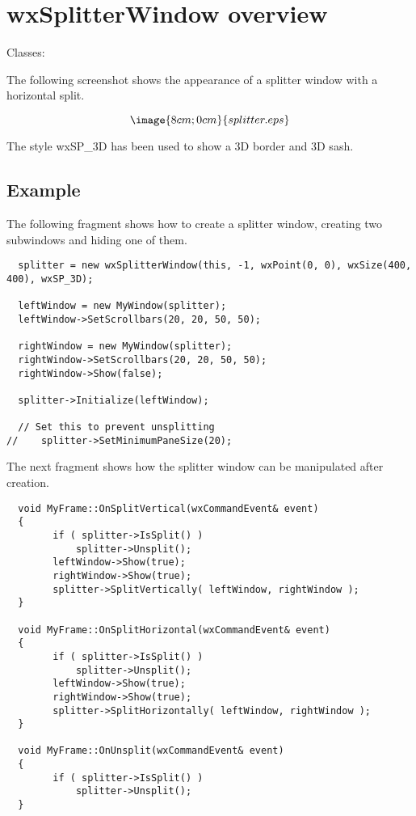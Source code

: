 \section{wxSplitterWindow overview}\label{wxsplitterwindowoverview}

Classes: 

The following screenshot shows the appearance of a splitter window with a horizontal split.

$$\image{8cm;0cm}{splitter.eps}$$

The style wxSP\_3D has been used to show a 3D border and 3D sash.

\subsection{Example}\label{wxsplitterwindowexample}

The following fragment shows how to create a splitter window, creating two
subwindows and hiding one of them.

{\small
\begin{verbatim}
  splitter = new wxSplitterWindow(this, -1, wxPoint(0, 0), wxSize(400, 400), wxSP_3D);

  leftWindow = new MyWindow(splitter);
  leftWindow->SetScrollbars(20, 20, 50, 50);

  rightWindow = new MyWindow(splitter);
  rightWindow->SetScrollbars(20, 20, 50, 50);
  rightWindow->Show(false);

  splitter->Initialize(leftWindow);

  // Set this to prevent unsplitting
//    splitter->SetMinimumPaneSize(20);
\end{verbatim}
}

The next fragment shows how the splitter window can be manipulated after creation.

{\small
\begin{verbatim}
  void MyFrame::OnSplitVertical(wxCommandEvent& event)
  {
        if ( splitter->IsSplit() )
            splitter->Unsplit();
        leftWindow->Show(true);
        rightWindow->Show(true);
        splitter->SplitVertically( leftWindow, rightWindow );
  }

  void MyFrame::OnSplitHorizontal(wxCommandEvent& event)
  {
        if ( splitter->IsSplit() )
            splitter->Unsplit();
        leftWindow->Show(true);
        rightWindow->Show(true);
        splitter->SplitHorizontally( leftWindow, rightWindow );
  }

  void MyFrame::OnUnsplit(wxCommandEvent& event)
  {
        if ( splitter->IsSplit() )
            splitter->Unsplit();
  }
\end{verbatim}
}

